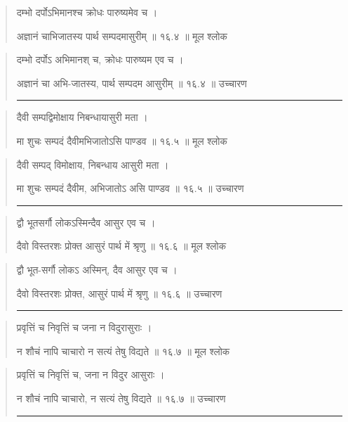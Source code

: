 \begin{quotation}

दम्भो दर्पोऽभिमानश्च क्रोधः पारुष्यमेव च ।  

अज्ञानं चाभिजातस्य पार्थ सम्पदमासुरीम्‌  ॥ १६.४ ॥  मूल श्लोक
\end{quotation}

\begin{quotation}

दम्भो दर्पोऽ अभिमानश् च, क्रोधः पारुष्यम एव च ।  

अज्ञानं चा अभि-जातस्य, पार्थ सम्पदम आसुरीम्‌  ॥ १६.४ ॥  उच्चारण

\noindent\rule{16cm}{0.4pt} 
\end{quotation}


\begin{quotation}

दैवी सम्पद्विमोक्षाय निबन्धायासुरी मता ।  

मा शुचः सम्पदं दैवीमभिजातोऽसि पाण्डव  ॥ १६.५ ॥  मूल श्लोक
\end{quotation}

\begin{quotation}

दैवी सम्पद् विमोक्षाय, निबन्धाय आसुरी मता ।  

मा शुचः सम्पदं दैवीम, अभिजातोऽ असि पाण्डव  ॥ १६.५ ॥  उच्चारण

\noindent\rule{16cm}{0.4pt} 
\end{quotation}


\begin{quotation}
द्वौ भूतसर्गौ लोकऽस्मिन्दैव आसुर एव च ।  

दैवो विस्तरशः प्रोक्त आसुरं पार्थ में श्रृणु  ॥ १६.६ ॥  मूल श्लोक
\end{quotation}

\begin{quotation}

द्वौ भूत-सर्गौ लोकऽ अस्मिन्, दैव आसुर एव च ।  

दैवो विस्तरशः प्रोक्त, आसुरं पार्थ में श्रृणु  ॥ १६.६ ॥  उच्चारण

\noindent\rule{16cm}{0.4pt} 
\end{quotation}


\begin{quotation}

प्रवृत्तिं च निवृत्तिं च जना न विदुरासुराः ।  

न शौचं नापि चाचारो न सत्यं तेषु विद्यते  ॥ १६.७ ॥  मूल श्लोक
\end{quotation}

\begin{quotation}

प्रवृत्तिं च निवृत्तिं च, जना न विदुर आसुराः ।  

न शौचं नापि चाचारो, न सत्यं तेषु विद्यते  ॥ १६.७ ॥  उच्चारण

\noindent\rule{16cm}{0.4pt} 
\end{quotation}


